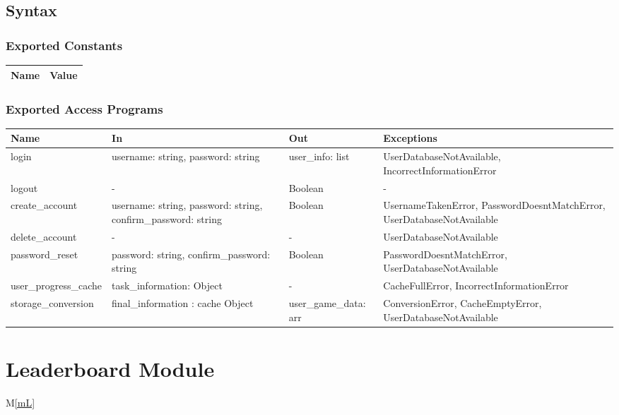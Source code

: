 \documentclass[12pt, titlepage]{article}
\newcommand{\mref}[1]{M\ref{#1}}
\begin{document}
\subsection{Syntax}

\subsubsection{Exported Constants}

\begin{center}
\begin{tabular}{p{10cm} p{4cm}}
\hline
\textbf{Name} & \textbf{Value}\\
\hline


\hline
\end{tabular}
\end{center}

\subsubsection{Exported Access Programs}

\begin{center}
\begin{tabular}{p{4cm} p{4cm} p{4cm} p{4cm}}
\hline
\textbf{Name} & \textbf{In} & \textbf{Out} & \textbf{Exceptions} \\
\hline
login & username: string, password: string & user\_info: list & UserDatabaseNotAvailable, IncorrectInformationError \\
logout & - & Boolean & - \\
create\_account & username: string, password: string, confirm\_password: string & Boolean & UsernameTakenError, PasswordDoesntMatchError, UserDatabaseNotAvailable \\
delete\_account & - & - & UserDatabaseNotAvailable \\
password\_reset & password: string, confirm\_password: string & Boolean & PasswordDoesntMatchError, UserDatabaseNotAvailable \\
user\_progress\_cache & task\_information: Object & - & CacheFullError, IncorrectInformationError \\
storage\_conversion & final\_information : cache Object & user\_game\_data: arr & ConversionError, CacheEmptyError, UserDatabaseNotAvailable\\
\hline
\end{tabular}
\end{center}

\newpage

\section{Leaderboard Module} \mref{mL} 
\end{document}
